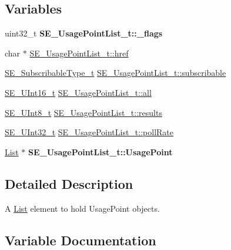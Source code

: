 \subsection*{Variables}
\begin{DoxyCompactItemize}
\item 
\mbox{\label{group__UsagePointList_ga4411987ab54935d12e0a3419ea714eaf}} 
uint32\+\_\+t {\bfseries S\+E\+\_\+\+Usage\+Point\+List\+\_\+t\+::\+\_\+flags}
\item 
char $\ast$ \hyperlink{group__UsagePointList_ga50a5a203dfb3fa45bd6f2aa6c8969789}{S\+E\+\_\+\+Usage\+Point\+List\+\_\+t\+::href}
\item 
\hyperlink{group__SubscribableType_ga5c41f553d369710ed34619266bf2551e}{S\+E\+\_\+\+Subscribable\+Type\+\_\+t} \hyperlink{group__UsagePointList_ga801cb7a2df80a375d5bd610359add3a9}{S\+E\+\_\+\+Usage\+Point\+List\+\_\+t\+::subscribable}
\item 
\hyperlink{group__UInt16_gac68d541f189538bfd30cfaa712d20d29}{S\+E\+\_\+\+U\+Int16\+\_\+t} \hyperlink{group__UsagePointList_ga91f4643b1bfe0a5f0933213245406464}{S\+E\+\_\+\+Usage\+Point\+List\+\_\+t\+::all}
\item 
\hyperlink{group__UInt8_gaf7c365a1acfe204e3a67c16ed44572f5}{S\+E\+\_\+\+U\+Int8\+\_\+t} \hyperlink{group__UsagePointList_gaa6b306a7e5ad0fdae577e81dc496c2e3}{S\+E\+\_\+\+Usage\+Point\+List\+\_\+t\+::results}
\item 
\hyperlink{group__UInt32_ga70bd4ecda3c0c85d20779d685a270cdb}{S\+E\+\_\+\+U\+Int32\+\_\+t} \hyperlink{group__UsagePointList_ga7f423f1fa17d9cadd34cae85acce3484}{S\+E\+\_\+\+Usage\+Point\+List\+\_\+t\+::poll\+Rate}
\item 
\mbox{\label{group__UsagePointList_ga855a6d8135f94bb5eebf6217b123df51}} 
\hyperlink{structList}{List} $\ast$ {\bfseries S\+E\+\_\+\+Usage\+Point\+List\+\_\+t\+::\+Usage\+Point}
\end{DoxyCompactItemize}


\subsection{Detailed Description}
A \hyperlink{structList}{List} element to hold Usage\+Point objects. 

\subsection{Variable Documentation}
\mbox{\label{group__UsagePointList_ga91f4643b1bfe0a5f0933213245406464}} 
